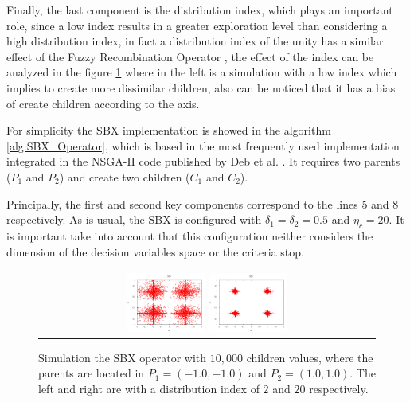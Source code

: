 Finally, the last component is the distribution index, which plays an important role, since a low index results in a greater exploration level than considering a high distribution index, in fact a distribution index of the unity has a similar effect of the Fuzzy Recombination Operator \cite{voigt1995fuzzy}, the effect of the index can be analyzed in the figure \ref{fig:Simulation_Case_3} where in the left is a simulation with a low index which implies to create more dissimilar children, also can be noticed that it has a bias of create children according to the axis.
%

%
For simplicity the SBX implementation is showed in the algorithm \ref{alg:SBX_Operator}, which is based in the most frequently used implementation integrated in the NSGA-II code published by Deb et al. \cite{Joel:NSGAII}.
%
It requires two parents ($P_1$ and $P_2$) and create two children ($C_1$ and $C_2$).
%

Principally, the first and second key components correspond to the lines 5 and 8 respectively. 
%
As is usual, the SBX is configured with $\delta_1 = \delta_2 = 0.5$ and $\eta_c = 20$.
%
It is important take into account that this configuration neither considers the dimension of the decision variables space or the criteria stop.

\begin{figure}[t]
\centering
\begin{tabular}{c}
   \includegraphics[width=0.24\textwidth]{img/SBX_eta_2.png}  %
   \includegraphics[width=0.24\textwidth]{img/SBX_eta_20.png} 
\end{tabular}
\caption{Simulation the SBX operator with $10,000$ children values, where the parents are located in $P_1=(-1.0, -1.0)$ and $P_2=(1.0, 1.0)$. The left and right are with a distribution index of $2$ and $20$ respectively.}
\label{fig:Simulation_Case_3}
\end{figure}